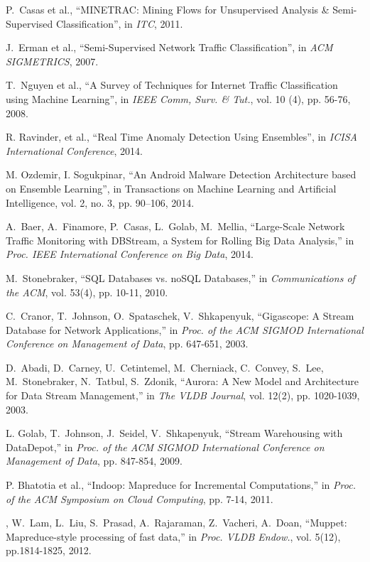 \documentclass[10pt, conference, letterpaper]{IEEEtran}
\begin{document}
\begin{thebibliography}{99}
P.~Casas et al., ``MINETRAC: Mining Flows for Unsupervised Analysis \& Semi-Supervised Classification'', in \emph{ITC}, 2011.

J.~Erman et al., ``Semi-Supervised Network Traffic Classification'', in \emph{ACM SIGMETRICS}, 2007.

T.~Nguyen et al., ``A Survey of Techniques for Internet Traffic Classification using Machine Learning'', in \emph{IEEE Comm, Surv. \& Tut.}, vol. 10 (4), pp. 56-76, 2008.

R. Ravinder, et al., ``Real Time Anomaly Detection Using Ensembles'', in \emph{ICISA International Conference}, 2014.

M. Ozdemir, I. Sogukpinar, ``An Android Malware Detection Architecture based on Ensemble Learning'', in Transactions on Machine Learning and Artificial Intelligence, vol. 2, no. 3, pp. 90--106, 2014.

A.~Baer, A.~Finamore, P.~Casas, L.~Golab, M.~Mellia, ``Large-Scale Network Traffic Monitoring with DBStream, a System for Rolling Big Data Analysis,'' in \emph{Proc. IEEE International Conference on Big Data}, 2014.

M.~Stonebraker, ``SQL Databases vs. noSQL Databases,'' in \emph{Communications of the ACM}, vol. 53(4), pp. 10-11, 2010.

C.~Cranor, T.~Johnson, O.~Spataschek, V.~Shkapenyuk, ``Gigascope: A Stream Database for Network Applications,'' in \emph{Proc. of the ACM SIGMOD International Conference on Management of Data}, pp. 647-651, 2003.

D.~Abadi, D.~Carney, U.~Cetintemel, M.~Cherniack, C.~Convey, S.~Lee, M.~Stonebraker, N.~Tatbul, S.~Zdonik, ``Aurora: A New Model and Architecture for Data Stream Management,'' in \emph{The VLDB Journal}, vol. 12(2), pp. 1020-1039, 2003.

L. Golab, T.~Johnson, J.~Seidel, V.~Shkapenyuk, ``Stream Warehousing with DataDepot,'' in \emph{Proc. of the ACM SIGMOD International Conference on Management of Data}, pp. 847-854, 2009.

P. Bhatotia et al., ``Indoop: Mapreduce for Incremental Computations,'' in \emph{Proc. of the ACM Symposium on Cloud Computing}, pp. 7-14, 2011.

, 
W.~Lam, L.~Liu, S.~Prasad, A.~Rajaraman, Z.~Vacheri, A.~Doan, ``Muppet: Mapreduce-style processing of fast data,'' in \emph{Proc. VLDB Endow.}, vol. 5(12), pp.1814-1825, 2012.


\end{thebibliography}
\end{document}

